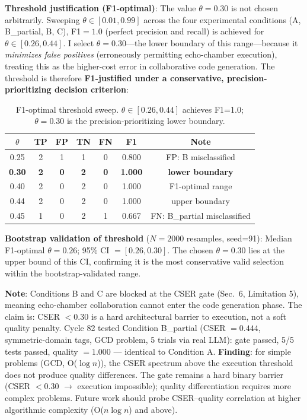 \documentclass[12pt]{article}
\begin{document}
\noindent\textbf{Threshold justification (F1-optimal)}:\label{sec:gate}
The value $\theta = 0.30$ is not chosen arbitrarily. Sweeping $\theta \in [0.01, 0.99]$
across the four experimental conditions (A, B\_partial, B, C), F1$=1.0$ (perfect
precision and recall) is achieved for $\theta \in [0.26, 0.44]$.
I select $\theta = 0.30$---the lower boundary of this range---because it \emph{minimizes
false positives} (erroneously permitting echo-chamber execution), treating this as the
higher-cost error in collaborative code generation. The threshold is therefore
\textbf{F1-justified under a conservative, precision-prioritizing decision criterion}:

\begin{table}[h!]\centering\small
\begin{tabular}{ccccccc}
\toprule
$\theta$ & TP & FP & TN & FN & F1 & Note \\
\midrule
0.25 & 2 & 1 & 1 & 0 & 0.800 & FP: B misclassified \\
\textbf{0.30} & \textbf{2} & \textbf{0} & \textbf{2} & \textbf{0} & \textbf{1.000} & \textbf{lower boundary} \\
0.40 & 2 & 0 & 2 & 0 & 1.000 & F1-optimal range \\
0.44 & 2 & 0 & 2 & 0 & 1.000 & upper boundary \\
0.45 & 1 & 0 & 2 & 1 & 0.667 & FN: B\_partial misclassified \\
\bottomrule
\end{tabular}
\caption{F1-optimal threshold sweep. $\theta \in [0.26, 0.44]$ achieves F1=1.0; $\theta=0.30$ is the precision-prioritizing lower boundary.}
\end{table}

\noindent\textbf{Bootstrap validation of threshold} ($N=2000$ resamples, seed=91):
Median F1-optimal $\theta = 0.26$; 95\% CI $= [0.26, 0.30]$.
The chosen $\theta = 0.30$ lies at the upper bound of this CI, confirming it is the
most conservative valid selection within the bootstrap-validated range.

\noindent\textbf{Note}: Conditions B and C are blocked at the CSER gate (Sec.~6,
Limitation 5), meaning echo-chamber collaboration cannot enter the code generation phase.
The claim is: CSER $< 0.30$ is a hard architectural barrier to execution, not a soft
quality penalty. Cycle 82 tested Condition B\_partial (CSER $= 0.444$, symmetric-domain
tags, GCD problem, 5 trials via real LLM): gate passed, 5/5 tests passed, quality $= 1.000$
--- identical to Condition A. \textbf{Finding}: for simple problems (GCD, O($\log n$)), the
CSER spectrum above the execution threshold does not produce quality differences. The
gate remains a hard binary barrier (CSER $< 0.30$ $\to$ execution impossible); quality
differentiation requires more complex problems. Future work should probe CSER--quality
correlation at higher algorithmic complexity (O($n \log n$) and above).
\end{document}
